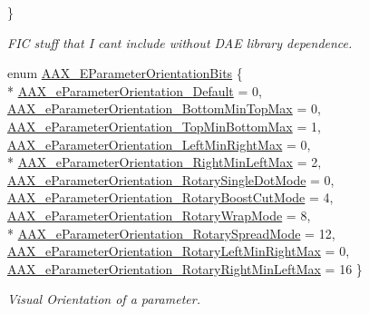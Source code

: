 \begin{DoxyCompactItemize}
 \}
\begin{DoxyCompactList}\small\item\em F\+I\+C stuff that I can\textquotesingle{}t include without D\+A\+E library dependence. \end{DoxyCompactList}\item 
enum \hyperlink{a00206_aa5ffa1ed828630b6b7a13c049d93ae87}{A\+A\+X\+\_\+\+E\+Parameter\+Orientation\+Bits} \{ \\*
\hyperlink{a00206_aa5ffa1ed828630b6b7a13c049d93ae87a6bfadbd9517f25ffc9bdb4ddb7da1f4b}{A\+A\+X\+\_\+e\+Parameter\+Orientation\+\_\+\+Default} = 0, 
\hyperlink{a00206_aa5ffa1ed828630b6b7a13c049d93ae87a0df7361517b3c7939f67647e873cb4d9}{A\+A\+X\+\_\+e\+Parameter\+Orientation\+\_\+\+Bottom\+Min\+Top\+Max} = 0, 
\hyperlink{a00206_aa5ffa1ed828630b6b7a13c049d93ae87abe18405b24c8a5d5b6174be10b8c4301}{A\+A\+X\+\_\+e\+Parameter\+Orientation\+\_\+\+Top\+Min\+Bottom\+Max} = 1, 
\hyperlink{a00206_aa5ffa1ed828630b6b7a13c049d93ae87a4e074c855fdeb439e2623d920173e752}{A\+A\+X\+\_\+e\+Parameter\+Orientation\+\_\+\+Left\+Min\+Right\+Max} = 0, 
\\*
\hyperlink{a00206_aa5ffa1ed828630b6b7a13c049d93ae87a0af7cb043bffaab1db4e96ccd06d6b45}{A\+A\+X\+\_\+e\+Parameter\+Orientation\+\_\+\+Right\+Min\+Left\+Max} = 2, 
\hyperlink{a00206_aa5ffa1ed828630b6b7a13c049d93ae87afa515dbe70fe88c026dd90328ec67992}{A\+A\+X\+\_\+e\+Parameter\+Orientation\+\_\+\+Rotary\+Single\+Dot\+Mode} = 0, 
\hyperlink{a00206_aa5ffa1ed828630b6b7a13c049d93ae87a87dddbd14fdcbd616a7f2502f6beed73}{A\+A\+X\+\_\+e\+Parameter\+Orientation\+\_\+\+Rotary\+Boost\+Cut\+Mode} = 4, 
\hyperlink{a00206_aa5ffa1ed828630b6b7a13c049d93ae87ab42ad685ac842d36bc7d1717c537c10a}{A\+A\+X\+\_\+e\+Parameter\+Orientation\+\_\+\+Rotary\+Wrap\+Mode} = 8, 
\\*
\hyperlink{a00206_aa5ffa1ed828630b6b7a13c049d93ae87aa977173bc8874b34228fbf2ca04f9d69}{A\+A\+X\+\_\+e\+Parameter\+Orientation\+\_\+\+Rotary\+Spread\+Mode} = 12, 
\hyperlink{a00206_aa5ffa1ed828630b6b7a13c049d93ae87a9f441bb5192bd7b7162ba588c8f4fea8}{A\+A\+X\+\_\+e\+Parameter\+Orientation\+\_\+\+Rotary\+Left\+Min\+Right\+Max} = 0, 
\hyperlink{a00206_aa5ffa1ed828630b6b7a13c049d93ae87acce02fc86d8eeafa3659ed0ee9f30186}{A\+A\+X\+\_\+e\+Parameter\+Orientation\+\_\+\+Rotary\+Right\+Min\+Left\+Max} = 16
 \}
\begin{DoxyCompactList}\small\item\em Visual Orientation of a parameter. \end{DoxyCompactList}\item 

\end{DoxyCompactItemize}
